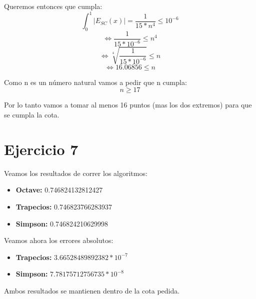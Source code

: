 \documentclass[a4paper,10pt]{article}
\begin{document}
\par Queremos entonces que cumpla:
\begin{equation}
	\int_0^1 \left| E_{SC}(x) \right| = \frac{1}{15*n^4} \leq 10^{-6}
\end{equation}
\begin{equation}
	\Leftrightarrow \frac{1}{15*10^{-6}} \leq n^4
\end{equation}
\begin{equation}
	\Leftrightarrow \sqrt[4]{\frac{1}{15*10^{-6}}} \leq n
\end{equation}
\begin{equation}
	\Leftrightarrow 16.06856 \leq n
\end{equation}
\par Como n es un número natural vamos a pedir que n cumpla:
\begin{equation}
	n \geq 17
\end{equation}
\par Por lo tanto vamos a tomar al menos 16 puntos (mas los dos extremos) para que se cumpla la cota.

\section{Ejercicio 7}
\par Veamos los resultados de correr los algoritmos:
\begin{itemize}
	\item \textbf{Octave:} 0.746824132812427
	\item \textbf{Trapecios:} 0.746823766283937
	\item \textbf{Simpson:} 0.746824210629998
\end{itemize}
\par Veamos ahora los errores absolutos:
\begin{itemize}
	\item \textbf{Trapecios:} $3.66528489892382 * 10^{-7}$
	\item \textbf{Simpson:} $7.78175712756735 * 10^{-8}$
\end{itemize}
\par Ambos resultados se mantienen dentro de la cota pedida.
\end{document}
